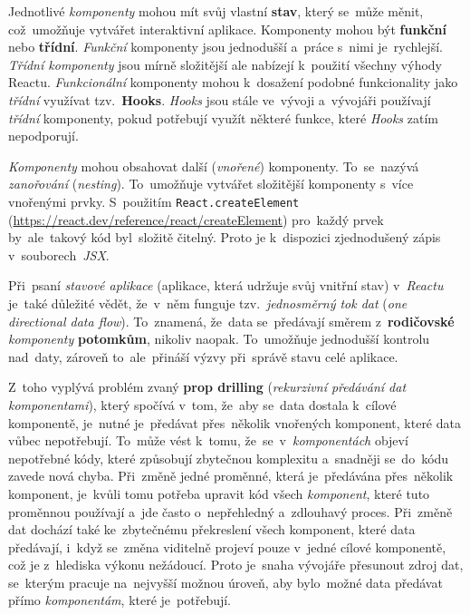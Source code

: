 \documentclass[11pt,a4paper]{report}
\begin{document}
            Jednotlivé \emph{komponenty} mohou mít svůj vlastní \textbf{stav}, který se~může měnit, což~umožňuje vytvářet interaktivní aplikace. Komponenty mohou být \textbf{funkční} nebo \textbf{třídní}. \emph{Funkční} komponenty jsou jednodušší a~práce s~nimi je~rychlejší. \emph{Třídní komponenty} jsou mírně složitější ale nabízejí k~použití všechny výhody Reactu. \emph{Funkcionální} komponenty mohou k~dosažení podobné funkcionality jako \emph{třídní} využívat tzv.~\textbf{Hooks}. \emph{Hooks} jsou stále ve~vývoji a~vývojáři používají \emph{třídní} komponenty, pokud potřebují využít některé funkce, které \emph{Hooks} zatím nepodporují.

            \emph{Komponenty} mohou obsahovat další (\emph{vnořené}) komponenty. To~se~nazývá \emph{zanořování} (\emph{nesting}). To~umožňuje vytvářet složitější komponenty s~více vnořenými prvky. S~použitím \texttt{React.createElement} (\url{https://react.dev/reference/react/createElement}) pro~každý prvek by~ale~takový kód byl~složitě čitelný. Proto je k~dispozici zjednodušený zápis v~souborech~\emph{JSX}.

            Při~psaní \emph{stavové aplikace} (aplikace, která udržuje svůj vnitřní stav) v~\emph{Reactu} je~také důležité vědět, že~v~něm funguje tzv.~\emph{jednosměrný tok dat} (\emph{one directional data flow}). To~znamená, že~data se~předávají směrem z~\textbf{rodičovské} \emph{komponenty} \textbf{potomkům}, nikoliv naopak. To~umožňuje jednodušší kontrolu nad~daty, zároveň to~ale~přináší výzvy při~správě stavu celé aplikace.
            
            Z~toho vyplývá problém zvaný \textbf{prop drilling} (\emph{rekurzivní předávání dat komponentami}), který spočívá v~tom, že~aby se~data dostala k~cílové komponentě, je~nutné je~předávat přes~několik vnořených komponent, které data vůbec nepotřebují. To~může vést k~tomu, že~se~v~\emph{komponentách} objeví nepotřebné kódy, které způsobují zbytečnou komplexitu a~snadněji se~do~kódu zavede nová chyba. Při~změně jedné proměnné, která je~předávána přes~několik komponent, je~kvůli tomu potřeba upravit kód všech \emph{komponent}, které tuto proměnnou používají a~jde často o~nepřehledný a~zdlouhavý proces. Při~změně dat dochází také ke~zbytečnému překreslení všech komponent, které data předávají, i~když se~změna viditelně projeví pouze v~jedné cílové komponentě, což je z~hlediska výkonu nežádoucí. Proto je~snaha vývojáře přesunout zdroj dat, se~kterým pracuje na~nejvyšší možnou úroveň, aby bylo~možné data předávat přímo \emph{komponentám}, které je~potřebují.
\end{document}
